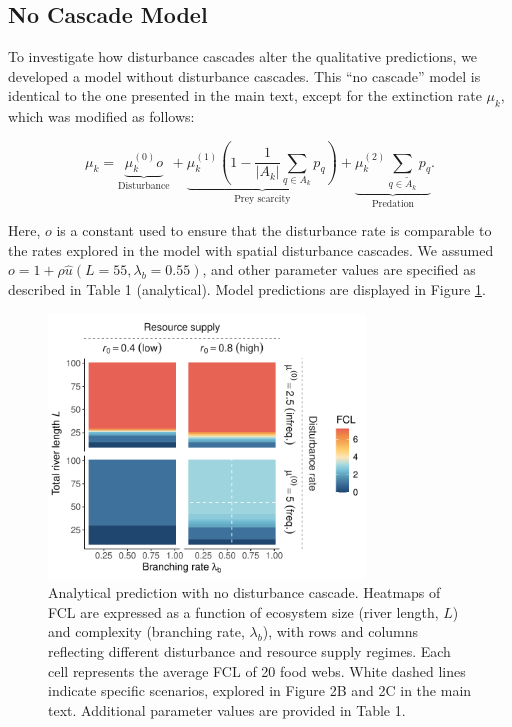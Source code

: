 \documentclass[11pt, class=article, crop=false]{standalone}
\theoremstyle{definition}
\begin{document}
\newpage

\subsection{No Cascade Model}

To investigate how disturbance cascades alter the qualitative predictions, we developed a model without disturbance cascades.
This ``no cascade'' model is identical to the one presented in the main text, except for the extinction rate $\mu_k$, which was modified as follows:

\begin{equation}
    \mu_{k} = 
        \underbrace{\mu_{k}^{(0)} o}_{\text{Disturbance}} + 
        \underbrace{\mu_{k}^{(1)} \left(1 - \frac{1}{|A_k|}\sum_{q \in A_k} p_{q} \right)}_{\text{Prey scarcity}} + 
        \underbrace{\mu_{k}^{(2)} \sum_{q \in \tilde{A}_k} p_{q}}_{\text{Predation}}.
\end{equation}

Here, $o$ is a constant used to ensure that the disturbance rate is comparable to the rates explored in the model with spatial disturbance cascades.
We assumed $o = 1 + \rho \hat{u}(L = 55, \lambda_b = 0.55)$, and other parameter values are specified as described in Table 1 (analytical).
Model predictions are displayed in Figure \ref{fig:no-cascade}.

\begin{figure}
\centering
\includegraphics[width=0.75\textwidth]{../data_fmt/fig_theo_rho0.pdf}
\caption{Analytical prediction with no disturbance cascade. Heatmaps of
FCL are expressed as a function of ecosystem size (river length, \(L\))
and complexity (branching rate, \(\lambda_b\)), with rows and columns
reflecting different disturbance and resource supply regimes. Each cell
represents the average FCL of 20 food webs. White dashed lines indicate
specific scenarios, explored in Figure 2B and 2C in the main text.
Additional parameter values are provided in Table 1.}
\label{fig:no-cascade}
\end{figure}
\end{document}
